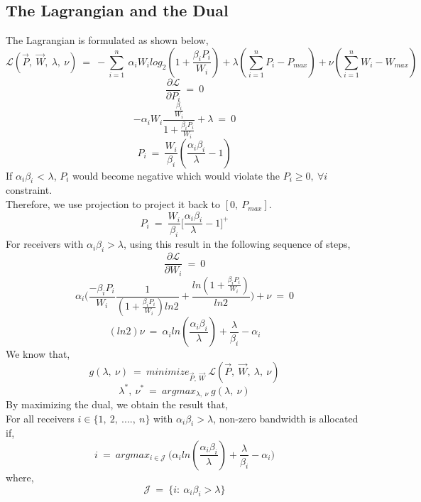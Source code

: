 \documentclass[12pt, draftcls, onecolumn]{IEEEtran}
\begin{document}
\subsection{The Lagrangian and the Dual}
The Lagrangian is formulated as shown below,
\[\mathcal{L}(\vec{P},\ \vec{W},\ \lambda,\ \nu)\ =\ -\sum_{i=1}^n\ \alpha_i W_i log_2(1 + \frac{\beta_i P_i}{W_i}) + \lambda(\sum_{i=1}^n P_i - P_{max}) + \nu(\sum_{i=1}^n W_i - W_{max})\]
\[\frac{\partial \mathcal{L}}{\partial P_i}\ =\ 0\]
\[-\alpha_i W_i \frac{\frac{\beta_i}{W_i}}{1 + \frac{\beta_i P_i}{W_i}} + \lambda\ =\ 0\]
\[P_i\ =\ \frac{W_i}{\beta_i}(\frac{\alpha_i \beta_i}{\lambda} - 1)\]
If $\alpha_i \beta_i$ < $\lambda$, $P_i$ would become negative which would violate the $P_i \geq 0,\ \forall i$ constraint. 
\\Therefore, we use projection to project it back to $[0,\ P_{max}]$.
\[P_i\ =\ \frac{W_i}{\beta_i}\Big[\frac{\alpha_i \beta_i}{\lambda} - 1\Big]^+\]
For receivers with $\alpha_i \beta_i > \lambda$, using this result in the following sequence of steps,
\[\frac{\partial \mathcal{L}}{\partial W_i}\ =\ 0\]
\[\alpha_i\Big(\frac{-\beta_i P_i}{W_i} \frac{1}{(1 + \frac{\beta_i P_i}{W_i})ln 2} + \frac{ln(1 + \frac{\beta_i P_i}{W_i})}{ln 2}\Big) + \nu\ =\ 0\]
\[(ln 2)\nu\ =\ \alpha_i ln(\frac{\alpha_i \beta_i}{\lambda}) + \frac{\lambda}{\beta_i} - \alpha_i\]
We know that,
\[g(\lambda,\ \nu)\ =\ minimize_{\vec{P},\ \vec{W}}\ \mathcal{L}(\vec{P},\ \vec{W},\ \lambda,\ \nu)\]
\[\lambda^*,\ \nu^*\ =\ argmax_{\lambda,\ \nu}\ g(\lambda,\ \nu)\]
By maximizing the dual, we obtain the result that,
\\For all receivers $i \in \{1,\ 2,\ ....,\ n\}$ with $\alpha_i \beta_i > \lambda$, non-zero bandwidth is allocated if,
\[i\ =\ argmax_{i \in \mathcal{J}}\ \Big(\alpha_i ln(\frac{\alpha_i \beta_i}{\lambda}) + \frac{\lambda}{\beta_i} - \alpha_i\Big)\]
where,
\[\mathcal{J}\ =\ \{i:\ \alpha_i \beta_i > \lambda\}\]
\end{document}
